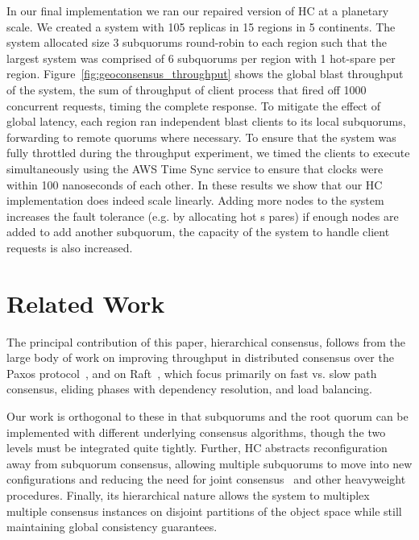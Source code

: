 \documentclass[10pt,conference]{IEEEtran}
\newcommand{\hc}{hierarchical consensus\xspace}
\newcommand{\sub}{subquorum\xspace}
\newcommand{\subs}{subquorums\xspace}
\newcommand{\roo}{root quorum\xspace}
\begin{document}
In our final implementation we ran our repaired version of HC at a planetary scale.
We created a system with 105 replicas in 15 regions in 5 continents.
The system allocated size 3 subquorums round-robin to each region such that the largest
system was comprised of 6 subquorums per region with 1 hot-spare per region.
Figure~\ref{fig:geoconsensus_throughput} shows the global blast throughput of
the system, the sum of throughput of client process that fired off 1000 concurrent
requests, timing the complete response.
To mitigate the effect of global latency, each region ran independent blast clients to
its local subquorums, forwarding to remote quorums where necessary.
To ensure that the system was fully throttled during the throughput experiment, we timed
the clients to execute simultaneously using the AWS Time Sync service to ensure that
clocks were within 100 nanoseconds of each other.
In these results we show that our HC implementation does indeed scale linearly.
Adding more nodes to the system increases the fault tolerance (e.g. by allocating hot s
pares) if enough nodes are added to add another subquorum, the capacity of the system to
handle client requests is also increased.

\section{Related Work}
\label{section:related}


The principal contribution of this paper, \hc, follows from the
large body of work on improving throughput in distributed consensus
over the Paxos protocol~\cite{paxos_simple,epaxos,flexible_paxos,generalized_paxos},
and on Raft~\cite{raft,raft_refloated}, which focus primarily on fast vs.
slow path consensus, eliding phases with dependency resolution, and load
balancing.

Our work is orthogonal to these in that \subs and the \roo can be
implemented with different underlying consensus algorithms, though the
two levels must be integrated quite tightly.
Further, HC abstracts reconfiguration away from \sub consensus, allowing
multiple \subs to move into new configurations and reducing the need
for joint consensus~\cite{raft} and other heavyweight procedures.
Finally, its hierarchical nature allows the system to multiplex multiple
consensus instances on disjoint partitions of the object space while
still maintaining global consistency guarantees.
\end{document}
